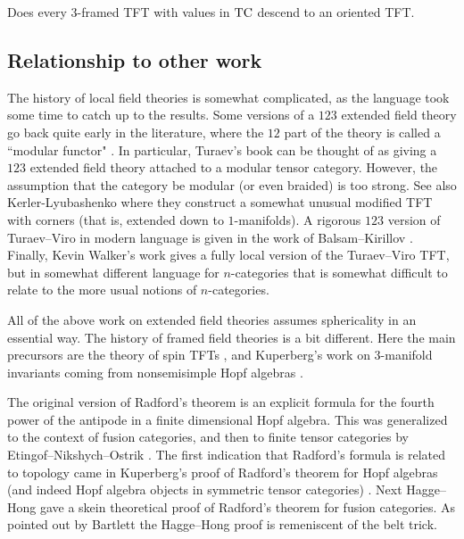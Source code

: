 \documentclass{amsart}
\begin{document}
\begin{question}
Does every $3$-framed TFT with values in $\mathrm{TC}$ descend to an oriented TFT.
\end{question}

\subsection{Relationship to other work}

The history of local field theories is somewhat complicated, as the language took some time to catch up to the results.  Some versions of a $123$ extended field theory go back quite early in the literature, where the $12$ part of the theory is called a ``modular functor" \cite{Segal, MR1002038, MR1159969,MR1797619}.  In particular, Turaev's book \cite{MR1292673} can be thought of as giving a $123$ extended field theory attached to a modular tensor category.  However, the assumption that the category be modular (or even braided) is too strong.  See also Kerler-Lyubashenko \cite{MR1862634} where they construct a somewhat unusual modified TFT with corners (that is, extended down to $1$-manifolds).   A rigorous $123$ version of Turaev--Viro in modern language is given in the work of Balsam--Kirillov \cite{1004.1533}.  Finally, Kevin Walker's work \cite{kw:tqft} gives a fully local version of the Turaev--Viro TFT, but in somewhat different language for $n$-categories that is somewhat difficult to relate to the more usual notions of $n$-categories.

All of the above work on extended field theories assumes sphericality in an essential way.  The history of framed field theories is a bit different.  Here the main precursors are the theory of spin TFTs \cite{MR1117149, MR1171303, MR1387228, MR1880321}, and Kuperberg's work on $3$-manifold invariants coming from nonsemisimple Hopf algebras \cite{MR1394749}.

The original version of Radford's theorem \cite{MR0407069} is an explicit formula for the fourth power of the antipode in a finite dimensional Hopf algebra.  This was generalized to the context of fusion categories, and then to finite tensor categories by Etingof--Nikshych--Ostrik \cite{MR2183279,MR2097289}.  The first indication that Radford's formula is related to topology came in Kuperberg's proof of Radford's theorem for Hopf algebras (and indeed Hopf algebra objects in symmetric tensor categories) \cite{MR1394749}.  Next Hagge--Hong \cite{MR2559711} gave a skein theoretical proof of Radford's theorem for fusion categories.  As pointed out by Bartlett \cite{0901.3975} the Hagge--Hong proof is remeniscent of the belt trick.
\end{document}
